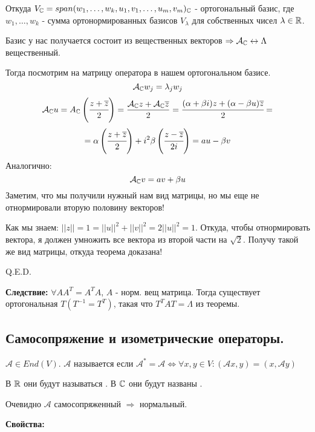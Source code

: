 Откуда $V_{\mathbb{C}} = span(w_1,\ldots,w_k, u_1,v_1,\ldots,u_m,v_m)_{\mathbb{C}}$ - ортогональный базис, где $w_1,\ldots, w_k$ - сумма ортонормированных базисов $V_\lambda$ для собственных чисел $\lambda \in \mathbb{R}$.

Базис у нас получается состоит из вещественных векторов $\Rightarrow \mathcal{A}_{\mathbb{C}}\leftrightarrow \Lambda$ вещественный. 

Тогда посмотрим на матрицу оператора в нашем ортогональном базисе. 
$$\mathcal{A}_{\mathbb{C}} w_j = \lambda_j w_j$$
$$ \mathcal{A}_{\mathbb{C}} u = A_{\mathbb{C}} \left(\cfrac{z + \overline{z}}{2}\right) = \frac{ \mathcal{A}_{\mathbb{C}} z +  \mathcal{A}_{\mathbb{C}} \overline{z}}{2} = \cfrac{(\alpha + \beta i)z + (\alpha - \beta u)\overline{z}}{2} =$$
$$=\alpha \left(\cfrac{z+\overline{z}}{2}\right) + i^2 \beta \left(\cfrac{z-\overline{z}}{2i}\right)  = au - \beta v$$
Аналогично:
$$\mathcal{A}_{\mathbb{C}} v = av + \beta u$$
Заметим, что мы получили нужный нам вид матрицы, но мы еще не отнормировали вторую половину векторов!

Как мы знаем: $||z|| = 1 =||u||^2 + ||v ||^2 = 2 ||u||^2 = 1$. Откуда, чтобы отнормировать вектора, я должен умножить все вектора из второй части на $\sqrt{2}$. Получу такой же вид матрицы, откуда теорема доказана!

\hfill Q.E.D.

\textbf{Следствие:} $\forall AA^T =A^T A$, $A$ - норм. вещ матрица. Тогда существует ортогональная $T (T^{-1}=T^T)$, такая что $T^TAT = \Lambda$ из теоремы.






\newpage
\subsection{Самосопряжение и изометрические операторы.}


 $\mathcal{A}\in End(V)$. $\mathcal{A}$ называется  если $\mathcal{A}^* =\mathcal{A} \Leftrightarrow \forall x,y \in V: (\mathcal{A}x,y) = (x,\mathcal{A}y) $

В $\mathbb{R}$ они будут называться . В $\mathbb{C}$ они будут названы . 

Очевидно $\mathcal{A}$ самосопряженный $\Rightarrow$ нормальный.

\textbf{Свойства:}

